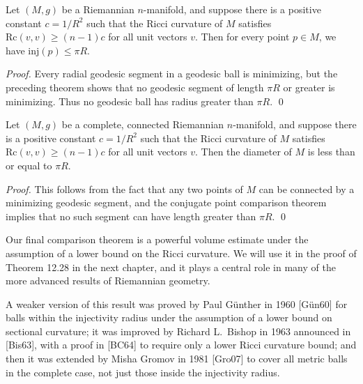 \begin{corollary}
\label{cor:injectivity-radius-ricci-bounded}

Let $(M, g)$ be a Riemannian $n$-manifold, and suppose there is a positive constant $c = 1/R^2$ such that the Ricci curvature of $M$ satisfies $\mathrm{Rc}(v,v) \geq (n-1)c$ for all unit vectors $v$. Then for every point $p \in M$, we have $\mathrm{inj}(p) \leq \pi R$.

\begin{proof}
Every radial geodesic segment in a geodesic ball is minimizing, but the preceding theorem shows that no geodesic segment of length $\pi R$ or greater is minimizing. Thus no geodesic ball has radius greater than $\pi R$. \qed
\end{proof}
\end{corollary}

\begin{corollary}
\label{cor:diameter-ricci-bounded}

Let $(M, g)$ be a complete, connected Riemannian $n$-manifold, and suppose there is a positive constant $c = 1/R^2$ such that the Ricci curvature of $M$ satisfies $\mathrm{Rc}(v,v) \geq (n-1)c$ for all unit vectors $v$. Then the diameter of $M$ is less than or equal to $\pi R$.

\begin{proof}
This follows from the fact that any two points of $M$ can be connected by a minimizing geodesic segment, and the conjugate point comparison theorem implies that no such segment can have length greater than $\pi R$. \qed
\end{proof}
\end{corollary}

Our final comparison theorem is a powerful volume estimate under the assumption
of a lower bound on the Ricci curvature. We will use it in the proof of Theorem
12.28 in the next chapter, and it plays a central role in many of the more advanced
results of Riemannian geometry.

A weaker version of this result was proved by Paul G\"unther in 1960 [G\"un60]
for balls within the injectivity radius under the assumption of a lower bound on
sectional curvature; it was improved by Richard L.\ Bishop in 1963 announced in
[Bis63], with a proof in [BC64] to require only a lower Ricci curvature bound; and
then it was extended by Misha Gromov in 1981 [Gro07] to cover all metric balls in
the complete case, not just those inside the injectivity radius.

